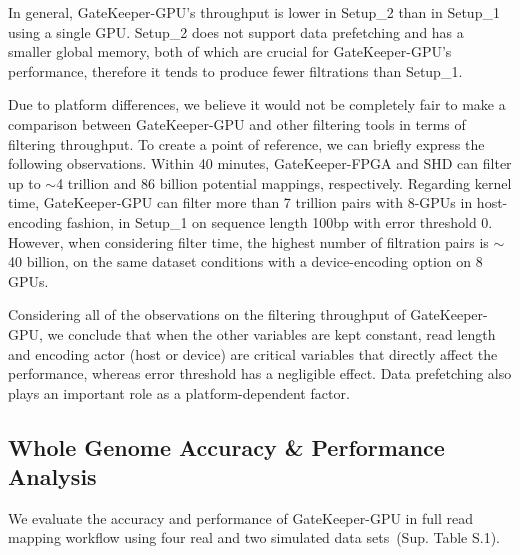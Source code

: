 
In general, GateKeeper-GPU's throughput is lower in Setup\_2 than in Setup\_1 using a single GPU. Setup\_2 does not support data prefetching and has a smaller global memory, both of which are crucial for GateKeeper-GPU's performance, therefore it tends to produce fewer filtrations than Setup\_1.

Due to platform differences, we believe it would not be completely fair to make a comparison between GateKeeper-GPU and other filtering tools in terms of filtering throughput. To create a point of reference, we can briefly express the following observations. Within 40 minutes, GateKeeper-FPGA and SHD can filter up to $\sim$4 trillion and $86$ billion potential mappings, respectively. Regarding kernel time, GateKeeper-GPU can filter more than 7 trillion pairs with 8-GPUs in host-encoding fashion, in Setup\_1 on sequence length 100bp with error threshold 0. However, when considering filter time, the highest number of filtration pairs is $\sim$40 billion, on the same dataset conditions with a device-encoding option on 8 GPUs. 

Considering all of the observations on the filtering throughput of GateKeeper-GPU, we conclude that when the other variables are kept constant, read length and encoding actor (host or device) are critical variables that directly affect the performance, whereas error threshold has a negligible effect. Data prefetching also plays an important role as a platform-dependent factor.   

\subsection{Whole Genome Accuracy \& Performance Analysis}
We evaluate the accuracy and performance of GateKeeper-GPU in full read mapping workflow using four real and two simulated data sets~(Sup. Table S.1).

